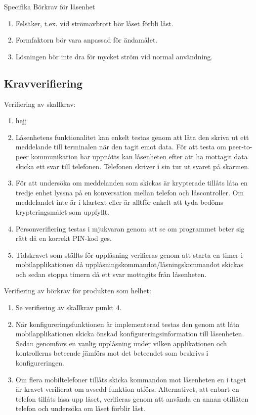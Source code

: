\documentclass[11pt]{article}
\begin{document}
Specifika Börkrav för låsenhet
\begin{enumerate}
\item Felsäker, t.ex. vid strömavbrott bör låset förbli låst.
\item Formfaktorn bör vara anpassad för ändamålet.
\item Lösningen bör inte dra för mycket ström vid normal användning.
\end{enumerate}

\subsection*{Kravverifiering}
Verifiering av skallkrav:
\begin{enumerate}
\item hejj
\item Låsenhetens funktionalitet kan enkelt testas genom att låta den skriva ut ett meddelande till terminalen när den tagit emot data. För att testa om peer-to-peer kommunikation har uppnåtts kan låsenheten efter att ha mottagit data skicka ett svar till telefonen. Telefonen skriver i sin tur ut svaret på skärmen.
\item För att undersöka om meddelanden som skickas är krypterade tillåts låta en tredje enhet lyssna på en konversation mellan telefon och låscontroller. Om meddelandet inte är i klartext eller är alltför enkelt att tyda bedöms krypteringsmålet som uppfyllt.
\item Personverifiering testas i mjukvaran genom att se om programmet beter sig rätt då en korrekt PIN-kod ges.
\item Tidskravet som ställts för upplåsning verifieras genom att starta en timer i mobilapplikationen då upplåsningskommandot/låsningskommandot skickas och sedan stoppa timern då ett svar mottagits från låsenheten.
\end{enumerate}

Verifiering av börkrav för produkten som helhet:
\begin{enumerate}
\item Se verifiering av skallkrav punkt 4.
\item När konfigureringsfunktionen är implementerad testas den genom att låta mobilapplikationen skicka önskad konfigureringsinformation till låsenheten. Sedan genomförs en vanlig upplåsning under vilken applikationen och kontrollerns beteende jämförs mot det beteendet som beskrivs i konfigureringen.
\item Om flera mobiltelefoner tillåts skicka kommandon mot låsenheten en i taget är kravet verifierat om avsedd funktion utförs. Alternativet, att enbart en telefon tillåts låsa upp låset, verifieras genom att använda en annan otillåten telefon och undersöka om låset förblir låst.
\end{enumerate}
\end{document}
